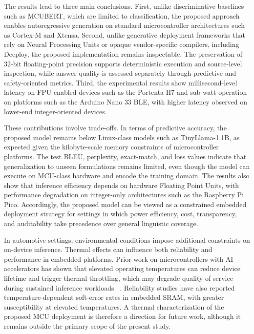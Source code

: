 \documentclass{ieeeaccess}
\begin{document}
The results lead to three main conclusions. First, unlike discriminative baselines such as MCUBERT, which are limited to classification, the proposed approach enables autoregressive generation on standard microcontroller architectures such as Cortex-M and Xtensa. Second, unlike generative deployment frameworks that rely on Neural Processing Units or opaque vendor-specific compilers, including Deeploy, the proposed implementation remains inspectable. The preservation of 32-bit floating-point precision supports deterministic execution and source-level inspection, while answer quality is assessed separately through predictive and safety-oriented metrics. Third, the experimental results show millisecond-level latency on FPU-enabled devices such as the Portenta H7 and sub-watt operation on platforms such as the Arduino Nano 33 BLE, with higher latency observed on lower-end integer-oriented devices.

These contributions involve trade-offs. In terms of predictive accuracy, the proposed model remains below Linux-class models such as TinyLlama-1.1B, as expected given the kilobyte-scale memory constraints of microcontroller platforms. The test BLEU, perplexity, exact-match, and loss values indicate that generalization to unseen formulations remains limited, even though the model can execute on MCU-class hardware and encode the training domain. The results also show that inference efficiency depends on hardware Floating Point Units, with performance degradation on integer-only architectures such as the Raspberry Pi Pico. Accordingly, the proposed model can be viewed as a constrained embedded deployment strategy for settings in which power efficiency, cost, transparency, and auditability take precedence over general linguistic coverage.

In automotive settings, environmental conditions impose additional constraints on on-device inference. Thermal effects can influence both reliability and performance in embedded platforms. Prior work on microcontrollers with AI accelerators has shown that elevated operating temperatures can reduce device lifetime and trigger thermal throttling, which may degrade quality of service during sustained inference workloads~\cite{10.1145/3662009.3662020} \cite{electronics13112012}. Reliability studies have also reported temperature-dependent soft-error rates in embedded SRAM, with greater susceptibility at elevated temperatures. A thermal characterization of the proposed MCU deployment is therefore a direction for future work, although it remains outside the primary scope of the present study.
\end{document}
